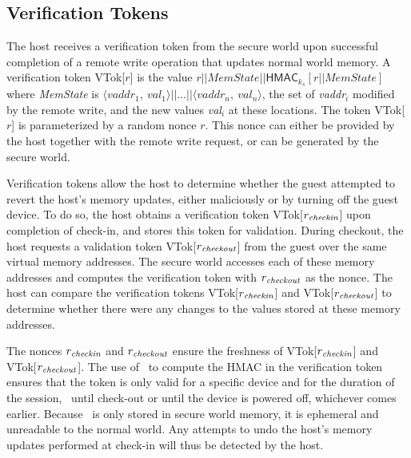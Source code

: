 \subsection{Verification Tokens}
\label{section:mechanism:tokens}

The host receives a verification token from the secure world upon successful
completion of a remote write operation that updates normal world memory. 
A verification token \textsf{VTok}[$r$] is the value
%
%
$
r||\textit{MemState}||\textsf{HMAC}_{k_s}[r||\textit{MemState}]$
%
%
where \textit{MemState} is
$\langle\textit{vaddr}_1,~\textit{val}_1\rangle||\ldots||\langle\textit{vaddr}_n,~\textit{val}_n\rangle$,
the set of \textit{vaddr}$_i$ modified by the remote write, and the new values
\textit{val}$_i$ at these locations. The token \textsf{VTok}[$r$] is
parameterized by a random nonce $r$. This nonce can either be provided by the
host together with the remote write request, or can be generated by the secure
world. 

Verification tokens allow the host to determine whether the guest attempted to
revert the host's memory updates, either maliciously or by turning off the
guest device. To do so, the host obtains a verification token
\textsf{VTok}[$r_{{\it checkin}}$] upon completion of check-in, and stores this
token for validation. During checkout, the host requests a validation token
\textsf{VTok}[$r_{\it checkout}$] from the guest over the same virtual memory
addresses. The secure world accesses each of these memory addresses and
computes the verification token with $r_{\it checkout}$ as the nonce. The host
can compare the verification tokens \textsf{VTok}[$r_{{\it checkin}}$] and
\textsf{VTok}[$r_{{\it checkout}}$] to determine whether there were any changes
to the values stored at these memory addresses. 

The nonces $r_{\it checkin}$ and $r_{\it checkout}$ ensure the freshness of
\textsf{VTok}[$r_{{\it checkin}}$] and \textsf{VTok}[$r_{{\it checkout}}$].
The use of \ks\ to compute the HMAC in the verification token ensures that the
token is only valid for a specific device and for the duration of the session,
\ie~until check-out or until the device is powered off, whichever comes
earlier. Because \ks\ is only stored in secure world memory, it is ephemeral
and unreadable to the normal world. Any attempts to undo the host's memory
updates performed at check-in will thus be detected by the host.

